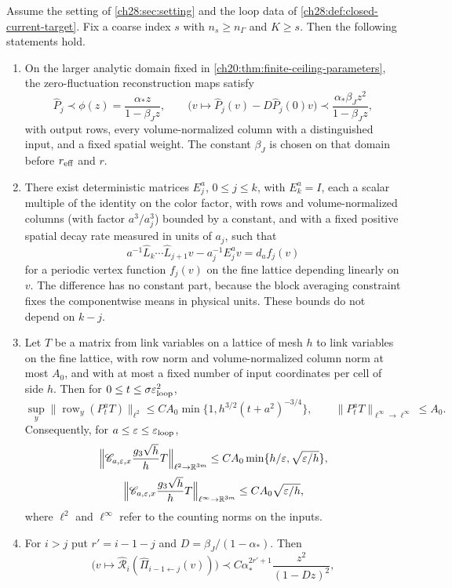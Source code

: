 \begin{theorem}\label{ch28:thm:one-shot-and-source-sum}
Assume the setting of \cref{ch28:sec:setting} and the loop data of \cref{ch28:def:closed-current-target}. Fix a coarse index $s$ with $n_s\ge n_\Gamma$ and $K\ge s$. Then the following statements hold.
\begin{enumerate}
\item On the larger analytic domain fixed in \cref{ch20:thm:finite-ceiling-parameters}, the zero-fluctuation reconstruction maps satisfy
\[
 \widehat P_j\prec\phi(z)=\frac{\alpha_*z}{1-\beta_Jz},\qquad
 \bigl(v\mapsto\widehat P_j(v)-D\widehat P_j(0)v\bigr)\prec\frac{\alpha_*\beta_Jz^2}{1-\beta_Jz},
\]
with output rows, every volume-normalized column with a distinguished input, and a fixed spatial weight. The constant $\beta_J$ is chosen on that domain before $r_{\rm eff}$ and $r$.
\item There exist deterministic matrices $E_j^a$, $0\le j\le k$, with $E_k^a=I$, each a scalar multiple of the identity on the color factor, with rows and volume-normalized columns (with factor $a^3/a_j^3$) bounded by a constant, and with a fixed positive spatial decay rate measured in units of $a_j$, such that
\[
 a^{-1}\widehat L_k\cdots\widehat L_{j+1}v-a_j^{-1}E_j^av=d_af_j(v)
\]
for a periodic vertex function $f_j(v)$ on the fine lattice depending linearly on $v$. The difference has no constant part, because the block averaging constraint fixes the componentwise means in physical units. These bounds do not depend on $k-j$.
\item Let $T$ be a matrix from link variables on a lattice of mesh $h$ to link variables on the fine lattice, with row norm and volume-normalized column norm at most $A_0$, and with at most a fixed number of input coordinates per cell of side $h$. Then for $0\le t\le\sigma\varepsilon_{\rm loop}^2$,
\[
 \sup_y\|\operatorname{row}_y(P^a_tT)\|_{\ell^2}\le CA_0\min\{1,h^{3/2}(t+a^2)^{-3/4}\},\qquad \|P^a_tT\|_{\ell^\infty\to\ell^\infty}\le A_0.
\]
Consequently, for $a\le\varepsilon\le\varepsilon_{\rm loop}$,
\[
 \Bigl\|\mathscr C_{a,\varepsilon,x}\frac{g_3\sqrt h}{h}T\Bigr\|_{\ell^2\to\mathbb R^{3m}}\le CA_0\min\{h/\varepsilon,\sqrt{\varepsilon/h}\},
\]
\[
 \Bigl\|\mathscr C_{a,\varepsilon,x}\frac{g_3\sqrt h}{h}T\Bigr\|_{\ell^\infty\to\mathbb R^{3m}}\le CA_0\sqrt{\varepsilon/h},
\]
where $\ell^2$ and $\ell^\infty$ refer to the counting norms on the inputs.
\item For $i>j$ put $r'=i-1-j$ and $D=\beta_J/(1-\alpha_*)$. Then
\[
 \bigl(v\mapsto\widehat{\mathcal R}_i(\widehat\Pi_{i-1\leftarrow j}(v))\bigr)\prec C\alpha_*^{2r'+1}\frac{z^2}{(1-Dz)^2},
\]
\end{enumerate}
\end{theorem}
